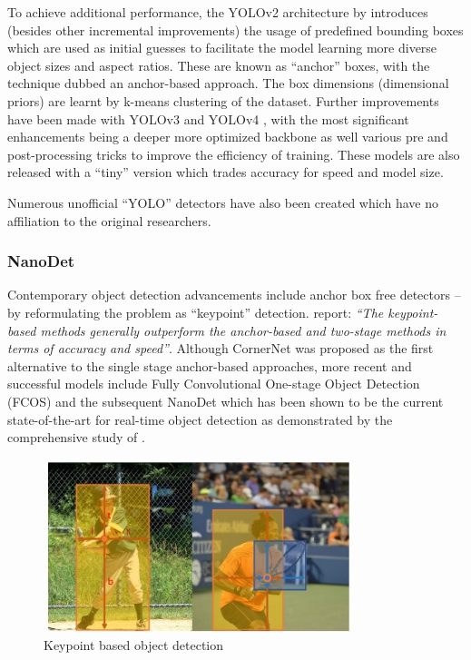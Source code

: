 \documentclass[a4paper,twoside,12pt]{report}
\begin{document}
To achieve additional performance, the YOLOv2 architecture by \cite{yolov2} introduces (besides other incremental improvements) the usage of predefined bounding boxes which are used as initial guesses to facilitate the model learning more diverse object sizes and aspect ratios. These are known as ``anchor'' boxes, with the technique dubbed an anchor-based approach. The box dimensions (dimensional priors) are learnt by k-means clustering of the dataset. Further improvements have been made with YOLOv3 \citep{yolov3} and YOLOv4 \citep{yolov4}, with the most significant enhancements being a deeper more optimized backbone as well various pre and post-processing tricks to improve the efficiency of training. These models are also released with a ``tiny'' version which trades accuracy for speed and model size.

Numerous unofficial ``YOLO'' detectors have also been created which have no affiliation to the original researchers.

\subsubsection{NanoDet}

Contemporary object detection advancements include anchor box free detectors -- by reformulating the problem as ``keypoint'' detection. \cite{comprehensive} report: \textit{``The keypoint-based methods generally outperform the anchor-based and two-stage methods in terms of accuracy and speed''}. Although CornerNet \citep{cornernet} was proposed as the first alternative to the single stage anchor-based approaches, more recent and successful models include Fully Convolutional One-stage Object Detection (FCOS) \citep{fcos} and the subsequent NanoDet \citep{nanodet} which has been shown to be the current state-of-the-art for real-time object detection as demonstrated by the comprehensive study of \cite{comprehensive}.

\begin{figure}[h!]
\begin{center}
\includegraphics[width=9cm]{images/keypointdetect.jpg}
\caption{Keypoint based object detection \citep{fcos}}
\label{fig:keypointdetect}
\end{center}
\end{figure}
\end{document}

